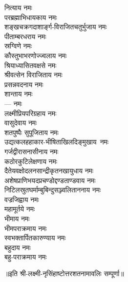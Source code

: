 \begin{multicols}{2}
\begin{flushleft}
नित्याय नमः\\
परब्रह्माभिधायकाय नमः\\
शङ्खचक्रगदाशार्ङ्ग-विराजितचतुर्भुजाय नमः\\
पीताम्बरधराय नमः\\
स्रग्विणे नमः\\
कौस्तुभाभरणोज्ज्वलाय नमः\\
श्रियाध्यासितवक्षसे नमः\\
श्रीवत्सेन विराजिताय नमः\\
प्रसन्नवदनाय नमः\hfill{}\\
शान्ताय नमः\\
--- नमः\\
लक्ष्मीप्रियपरिग्रहाय नमः\\
वासुदेवाय नमः\\
शतपुष्पैः सुपूजिताय नमः\\
उद्यत्कलहहाकार-भीषिताखिलदिङ्मुखाय~नमः\\
गर्जद्वीरासनासीनाय नमः\\
कठोरकुटिलेक्षणाय नमः\\
दैतेयवक्षोदलनसान्द्रीकृतनखायुधाय नमः\\
अशेषप्राणिभयदप्रचण्डोद्दण्डताण्डवाय नमः\hfill{}\\
निटिलस्रुतघर्माम्बुबिन्दुसञ्ज्वलिताननाय नमः\\
वज्रजिह्वाय नमः\\
महामूर्तये नमः\\
भीमाय नमः\\
भीमपराक्रमाय नमः\\
स्वभक्तार्पितकारुण्याय नमः\\
बहुदाय नमः\\
बहु-पराक्रमाय नमः\hfill{}\\
\end{flushleft}
\end{multicols}
॥इति श्री-लक्ष्मी-नृसिंहाष्टोत्तरशतनामावलिः सम्पूर्णा॥
